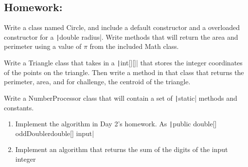 \documentclass[11pt,fleqn]{article}
\newcommand{\mil}[2][java]{\texttt|#2|}
\begin{document}
\subsection*{Homework:} Write a class named Circle, and include a default constructor and a overloaded constructor for a \mil{double radius}. Write methods that will return the area and perimeter using a value of $\pi$ from the included Math class.

Write a Triangle class that takes in a \mil{int[][]} that stores the integer coordinates of the points on the triangle. Then write a method in that class that returns the perimeter, area, and for challenge, the centroid of the triangle.

Write a NumberProcessor class that will contain a set of \mil{static} methods and constants. 
\begin{enumerate}
\item Implement the algorithm in Day 2's homework. As \mil{public double[] oddDoubler{double[] input}}
\item Implement an algorithm that returns the sum of the digits of the input integer
\end{enumerate}
\end{document}
